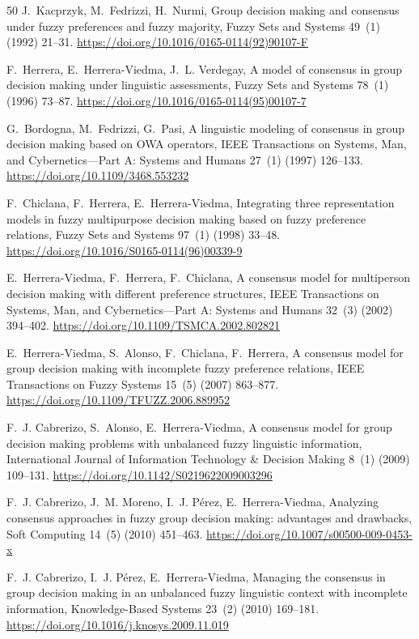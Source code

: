 \documentclass[preprint,11pt]{elsarticle}
\begin{document}
\begin{thebibliography}{50}
J.~Kacprzyk, M.~Fedrizzi, H.~Nurmi, Group decision making and consensus
under fuzzy preferences and fuzzy majority, Fuzzy Sets and Systems
49~(1) (1992) 21--31.
\url{https://doi.org/10.1016/0165-0114(92)90107-F}

F.~Herrera, E.~Herrera-Viedma, J.~L. Verdegay, A model of consensus in
group decision making under linguistic assessments, Fuzzy Sets and
Systems 78~(1) (1996) 73--87.
\url{https://doi.org/10.1016/0165-0114(95)00107-7}

G.~Bordogna, M.~Fedrizzi, G.~Pasi, A linguistic modeling of consensus
in group decision making based on OWA operators, IEEE Transactions on
Systems, Man, and Cybernetics---Part A: Systems and Humans 27~(1)
(1997) 126--133.
\url{https://doi.org/10.1109/3468.553232}

F.~Chiclana, F.~Herrera, E.~Herrera-Viedma, Integrating three
representation models in fuzzy multipurpose decision making based on
fuzzy preference relations, Fuzzy Sets and Systems 97~(1) (1998)
33--48.
\url{https://doi.org/10.1016/S0165-0114(96)00339-9}

E.~Herrera-Viedma, F.~Herrera, F.~Chiclana, A consensus model for
multiperson decision making with different preference structures, IEEE
Transactions on Systems, Man, and Cybernetics---Part A: Systems and
Humans 32~(3) (2002) 394--402.
\url{https://doi.org/10.1109/TSMCA.2002.802821}

E.~Herrera-Viedma, S.~Alonso, F.~Chiclana, F.~Herrera, A consensus
model for group decision making with incomplete fuzzy preference
relations, IEEE Transactions on Fuzzy Systems 15~(5) (2007) 863--877.
\url{https://doi.org/10.1109/TFUZZ.2006.889952}

F.~J. Cabrerizo, S.~Alonso, E.~Herrera-Viedma, A consensus model for
group decision making problems with unbalanced fuzzy linguistic
information, International Journal of Information Technology \&
Decision Making 8~(1) (2009) 109--131.
\url{https://doi.org/10.1142/S0219622009003296}

F.~J. Cabrerizo, J.~M. Moreno, I.~J. P\'erez, E.~Herrera-Viedma,
Analyzing consensus approaches in fuzzy group decision making:
advantages and drawbacks, Soft Computing 14~(5) (2010) 451--463.
\url{https://doi.org/10.1007/s00500-009-0453-x}

F.~J. Cabrerizo, I.~J. P\'erez, E.~Herrera-Viedma, Managing the
consensus in group decision making in an unbalanced fuzzy linguistic
context with incomplete information, Knowledge-Based Systems 23~(2)
(2010) 169--181.
\url{https://doi.org/10.1016/j.knosys.2009.11.019}


\end{thebibliography}
\end{document}
